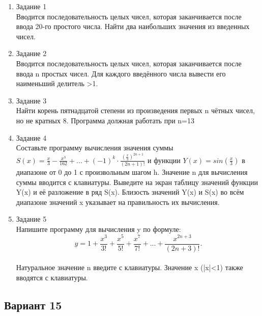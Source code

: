 \documentclass[a4paper]{article}
\begin{document}
	
	\begin{enumerate} 
		\item Задание 1 \\
		Вводится последовательность целых чисел, которая заканчивается после ввода 20-го простого числа. Найти два наибольших значения из введенных чисел.\\
		\item Задание 2\\
		Вводится последовательность целых чисел, которая заканчивается после ввода n простых чисел. Для каждого введённого числа вывести его наименьший делитель >1.\\
		\item Задание 3 \\
		Найти корень пятнадцатой степени из произведения первых n чётных чисел, но не кратных 8. Программа должная работать при n=13\\
		\item Задание 4 \\ 
		Составьте программу вычисления значения суммы  $S(x)=\frac{x}{3}-\frac{x^3}{162}+...+(-1)^k\cdot\frac{{(\frac{x}{3})}^{2n+1}}{(2n+1)!}$
		и функции $Y(x)=sin(\frac{x}{3})$ в диапазоне от 0 до 1
		с произвольным шагом h. Значение n для вычисления суммы вводится с клавиатуры. Выведите на экран таблицу значений функции Y(x) и её разложение в ряд S(x). Близость значений Y(x) и S(x) во всём диапазоне
		значений x указывает на правильность их вычисления.\\
		\item Задание 5 \\
		Напишите программу для вычисления y по формуле:\\
		$$y=1+\frac{x^3}{3!}+\frac{x^5}{5!}+\frac{x^7}{7!}+...+\frac{x^{2n+3}}{(2n+3)!}.$$\\
		Натуральное значение n введите с клавиатуры. Значение x (|x|<1) также вводятся с клавиатуры.\\
		
	\end{enumerate}
	\newpage
	\begin{center}
		\subsection*{Вариант 15}
	\end{center}
	
\end{document}
